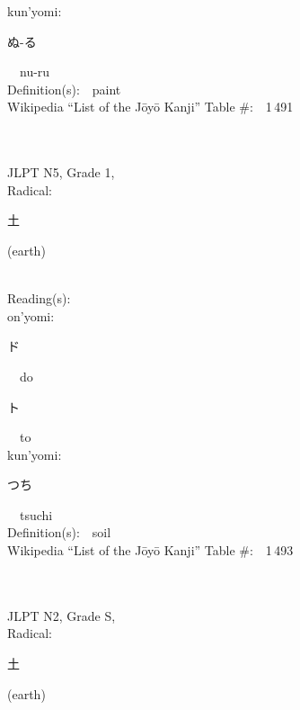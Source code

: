 \begin{multicols}{2}
{\hspace*{1em}}kun'yomi:\ \ \\
{\hspace*{2em}}{\begin{CJK}{UTF8}{min} ぬ-る \end{CJK}}\ \ nu-ru\ \ \\
Definition(s):\ \ paint \\
Wikipedia ``List of the J\=oy\=o Kanji'' Table \#:\ \ 1\,491 \\
\ \ \\
{\fontsize{34pt}{40pt}  }\ \ \\  %
{JLPT N5, Grade 1, \\Radical:\ \ {\begin{CJK}{UTF8}{min} 土 \end{CJK}} (earth) } \\
Reading(s):\ \ \\
{\hspace*{1em}}on'yomi:\ \ \\
{\hspace*{2em}}{\begin{CJK}{UTF8}{min} ド \end{CJK}}\ \ do\ \ \\
{\hspace*{2em}}{\begin{CJK}{UTF8}{min} ト \end{CJK}}\ \ to\ \ \\
{\hspace*{1em}}kun'yomi:\ \ \\
{\hspace*{2em}}{\begin{CJK}{UTF8}{min} つち \end{CJK}}\ \ tsuchi\ \ \\
Definition(s):\ \ soil \\
Wikipedia ``List of the J\=oy\=o Kanji'' Table \#:\ \ 1\,493 \\
\ \ \\
{\fontsize{34pt}{40pt}  }\ \ \\  %
{JLPT N2, Grade S, \\Radical:\ \ {\begin{CJK}{UTF8}{min} 土 \end{CJK}} (earth) } \\

\end{multicols}
